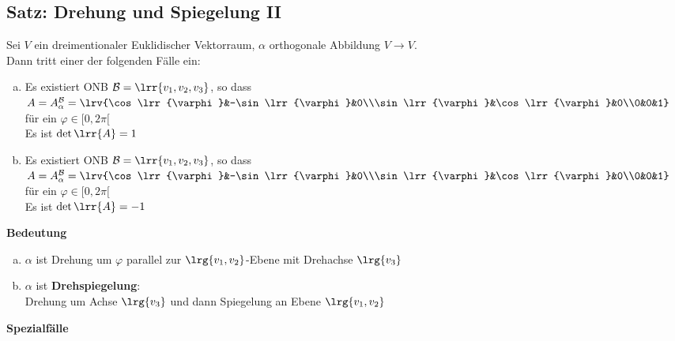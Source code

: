 \subsection{Satz: Drehung und Spiegelung II}
	Sei $V$ ein dreimentionaler Euklidischer Vektorraum, $\alpha$ orthogonale Abbildung $V\rightarrow V$.\\
	Dann tritt einer der folgenden Fälle ein:
	\begin{enumerate}[a)]
		\item Es existiert ONB $\mathcal{B}=\lrr{v_1,v_2,v_3}$, so dass $A=A_{\alpha}^{\mathcal{B}}=\lrv{\cos\lrr{\varphi}&-\sin\lrr{\varphi}&0\\\sin\lrr{\varphi}&\cos\lrr{\varphi}&0\\0&0&1}$ für ein $\varphi\in [0,2\pi[$\\
			Es ist $\det\lrr{A}=1$
		\item Es existiert ONB $\mathcal{B}=\lrr{v_1,v_2,v_3}$, so dass $A=A_{\alpha}^{\mathcal{B}}=\lrv{\cos\lrr{\varphi}&-\sin\lrr{\varphi}&0\\\sin\lrr{\varphi}&\cos\lrr{\varphi}&0\\0&0&1}$ für ein $\varphi\in [0,2\pi[$\\
			Es ist $\det\lrr{A}=-1$
	\end{enumerate}
	\textbf{Bedeutung}
	\begin{enumerate}[a)]
		\item $\alpha$ ist Drehung um $\varphi$ parallel zur $\lrg{v_1,v_2}$-Ebene mit Drehachse $\lrg{v_3}$
			
		
		\item $\alpha$ ist \textbf{Drehspiegelung}:\\
			Drehung um Achse $\lrg{v_3}$ und dann Spiegelung an Ebene $\lrg{v_1,v_2}$
	\end{enumerate}
	\textbf{Spezialfälle}
